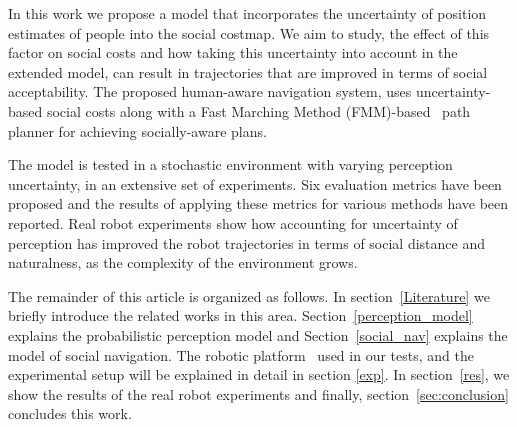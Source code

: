 In this work we propose a model that incorporates the uncertainty of position estimates of people into the social costmap. We aim to study, the effect of this factor on social costs and how taking this uncertainty into account in the extended model, can result in trajectories that are improved in terms of social acceptability. The proposed human-aware navigation system, uses uncertainty-based social costs along with a Fast Marching Method (FMM)-based~\cite{sethian1999fast} path planner for achieving socially-aware plans. 


The model is tested in a stochastic environment with varying perception uncertainty, in an extensive set of experiments. Six evaluation metrics have been proposed and the results of applying these metrics for various methods have been reported. Real robot experiments show how accounting for uncertainty of perception has improved the robot trajectories in terms of social distance and naturalness, as the complexity of the environment grows.

The remainder of this article is organized as follows. In section~\ref{Literature} we briefly introduce the related works in this area. Section~\ref{perception_model} explains the probabilistic perception model and Section~\ref{social_nav} explains the model of social navigation. The robotic platform~\cite{Messias2014robotic} used in our tests, and the experimental setup will be explained in detail in section \ref{exp}. In section~\ref{res}, we show the results of the real robot experiments and finally, section~\ref{sec:conclusion} concludes this work.







